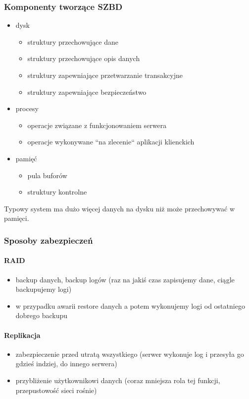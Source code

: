 \documentclass[12pt]{article}
\begin{document}
\subsubsection{Komponenty tworzące \ac{SZBD}}
\begin{itemize}
\item dysk
\begin{itemize}
\item struktury przechowujące dane
\item struktury przechowujące opis danych
\item struktury zapewniające przetwarzanie transakcyjne
\item struktury zapewniające bezpieczeństwo
\end{itemize}
\item procesy
\begin{itemize}
\item operacje związane z funkcjonowaniem serwera
\item operacje wykonywane ``na zlecenie`` aplikacji klienckich
\end{itemize}
\item pamięć
\begin{itemize}
\item pula buforów
\item struktury kontrolne
\end{itemize}
\end{itemize}

Typowy system ma dużo więcej danych na dysku niż może przechowywać w pamięci.

\subsubsection{Sposoby zabezpieczeń}
\paragraph{\acs{RAID}}
\begin{itemize}
\item backup danych, backup logów (raz na jakiś czas zapisujemy dane, ciągle backupujemy logi)
\item w przypadku awarii restore danych a potem wykonujemy logi od ostatniego dobrego backupu
\end{itemize}

\paragraph{Replikacja}
\begin{itemize}
\item zabezpieczenie przed utratą wszystkiego (serwer wykonuje log i przesyła go gdzieś indziej, do innego serwera)
\item przybliżenie użytkownikowi danych (coraz mniejsza rola tej funkcji, przepustowość sieci rośnie)
\end{itemize}
\end{document}
